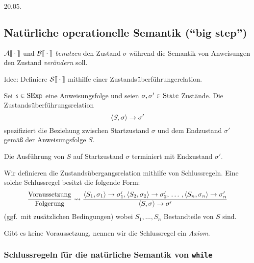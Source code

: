 \newpage
\hfill 20.05.
\subsection{Natürliche operationelle Semantik (``big step'')}

$\mathcal{A}\mathrm{[}\kern-.14em\mathrm{[}\cdot\mathrm{]}\kern-.14em\mathrm{]}$ und $\mathcal{B}\mathrm{[}\kern-.14em\mathrm{[}\cdot\mathrm{]}\kern-.14em\mathrm{]}$ \emph{benutzen} den Zustand $\sigma$ während die Semantik von Anweisungen den Zustand \emph{verändern} soll.

Idee: Definiere $\mathcal{S}\mathrm{[}\kern-.14em\mathrm{[}\cdot\mathrm{]}\kern-.14em\mathrm{]}$ mithilfe einer Zustandsüberführungerelation.

\begin{definition}
    Sei $s \in \operatorname{SExp}$ eine Anweisungsfolge und seien $\sigma, \sigma' \in \operatorname{State}$ Zustände. Die Zustandsüberführungsrelation
    \[
    \langle S, \sigma \rangle \to \sigma'
    \]
    spezifiziert die Beziehung zwischen Startzustand $\sigma$ und dem Endzustand $\sigma'$ gemäß der Anweisungsfolge $S$.
\end{definition}

\begin{remark}[Bedeutung]
    Die Ausführung von $S$ auf Startzustand $\sigma$ terminiert mit Endzustand $\sigma'$.
\end{remark}

\par\medskip
\begin{notation}
    Wir definieren die Zustandsübergangsrelation mithilfe von Schlussregeln. Eine solche Schlussregel besitzt die folgende Form:
    \[
    \frac{\text{Voraussetzung}}{\text{Folgerung}} \leadsto \frac{\langle S_1, \sigma_1 \rangle \to \sigma_1', \langle S_2, \sigma_2 \rangle \to \sigma_2', \,\dots\, , \langle S_n, \sigma_n \rangle \to \sigma_n'}{\langle S, \sigma \rangle \to \sigma'}
    \]
    (ggf.\ mit zusätzlichen Bedingungen) wobei $S_1, \dots, S_n$ Bestandteile von $S$ sind.

    Gibt es keine Voraussetzung, nennen wir die Schlussregel ein \emph{Axiom}.
\end{notation}



\subsubsection{Schlussregeln für die natürliche Semantik von \texttt{while}}

